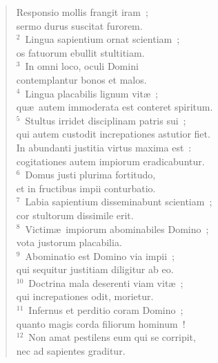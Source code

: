 \begin{flushleft}\begin{verse}\vspace{-19pt}\hspace{6pt}Responsio mollis frangit iram~;\\\hspace{6pt} sermo durus suscitat furorem.\\
${}^{2}$~Lingua sapientium ornat scientiam~;\\ os fatuorum ebullit stultitiam.\\
${}^{3}$~In omni loco, oculi Domini\\ contemplantur bonos et malos.\\
${}^{4}$~Lingua placabilis lignum vit\ae~;\\ qu\ae\ autem immoderata est conteret spiritum.\\
${}^{5}$~Stultus irridet disciplinam patris sui~;\\ qui autem custodit increpationes astutior fiet.\\ In abundanti justitia virtus maxima est~:\\ cogitationes autem impiorum eradicabuntur.\\
${}^{6}$~Domus justi plurima fortitudo,\\ et in fructibus impii conturbatio.\\
${}^{7}$~Labia sapientium disseminabunt scientiam~;\\ cor stultorum dissimile erit.\\
${}^{8}$~Victim\ae\ impiorum abominabiles Domino~;\\ vota justorum placabilia.\\
${}^{9}$~Abominatio est Domino via impii~;\\ qui sequitur justitiam diligitur ab eo.\\
${}^{10}$~Doctrina mala deserenti viam vit\ae~;\\ qui increpationes odit, morietur.\\
${}^{11}$~Infernus et perditio coram Domino~;\\ quanto magis corda filiorum hominum~!\\
${}^{12}$~Non amat pestilens eum qui se corripit,\\ nec ad sapientes graditur.\end{verse}\end{flushleft}


